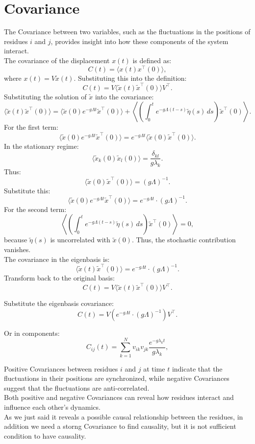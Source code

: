 \documentclass[English, Lau, oneside]{sapthesis}
\begin{document}
\section{Covariance}
\noindent
The Covariance between two variables, such as the fluctuations in the positions of residues \( i \) and \( j \), provides insight into how these components of the system interact.\\
The covariance of the displacement \({x}(t)\) is defined as:\cite{ref13}
\[
{C}(t) = \langle {x}(t) {x}^\top(0) \rangle,
\]
where \({x}(t) = {V} \tilde{{x}}(t)\). Substituting this into the definition:
\[
{C}(t) = {V} \langle \tilde{{x}}(t) \tilde{{x}}^\top(0) \rangle {V}^\top.
\]
Substituting the solution of $\tilde{{x}}$ into the covariance:
\[
\langle \tilde{{x}}(t) \tilde{{x}}^\top(0) \rangle = \langle \tilde{{x}}(0) e^{-{g \Lambda} t} \tilde{{x}}^\top(0) \rangle + \left\langle \left( \int_0^t e^{-g {\Lambda} (t-s)} \tilde{{\eta}}(s) \, ds \right) \tilde{{x}}^\top(0) \right\rangle.
\]
For the first term:
\[
\langle \tilde{{x}}(0) e^{-{g \Lambda} t} \tilde{{x}}^\top(0) \rangle = e^{-{g \Lambda} t} \langle \tilde{{x}}(0) \tilde{{x}}^\top(0) \rangle.
\]
In the stationary regime:
\[
\langle \tilde{x}_k(0) \tilde{x}_l(0) \rangle =  \frac{\delta_{kl}}{g \lambda_k}.
\]
Thus:
\[
\langle \tilde{{x}}(0) \tilde{{x}}^\top(0) \rangle = ({g \Lambda})^{-1}.
\]
Substitute this:
\[
\langle \tilde{{x}}(0) e^{-{g \Lambda} t} \tilde{{x}}^\top(0) \rangle = e^{-{g \Lambda} t} \cdot ({g \Lambda})^{-1} .
\]
For the second term:
\[
\left\langle \left( \int_0^t e^{- g {\Lambda} (t-s)} \tilde{{\eta}}(s) \, ds \right) \tilde{{x}}^\top(0) \right\rangle = 0,
\]
because \(\tilde{{\eta}}(s)\) is uncorrelated with \(\tilde{{x}}(0)\).
Thus, the stochastic contribution vanishes.\\
The covariance in the eigenbasis is:
\[
\langle \tilde{{x}}(t) \tilde{{x}}^\top(0) \rangle = e^{-{g \Lambda} t} \cdot ({g \Lambda})^{-1}.
\]
Transform back to the original basis:
\[
{C}(t) = {V} \langle \tilde{{x}}(t) \tilde{{x}}^\top(0) \rangle {V}^\top.
\]

Substitute the eigenbasis covariance:
\[
{C}(t) = {V} \left( e^{-{g \Lambda} t} \cdot ({g \Lambda})^{-1}  \right) {V}^\top.
\]


Or in components:
\[
C_{ij}(t) = \sum_{k=1}^N v_{ik} v_{jk} \frac{e^{-g \lambda_k t}}{g \lambda_k} ,
\]

Positive Covariances between residues \(i\) and \(j\) at time \(t\) indicate that the fluctuations in their positions are synchronized, while negative Covariances suggest that the fluctuations are anti-correlated.\\
Both positive and negative Covariances can reveal how residues interact and influence each other's dynamics.\\
As we just said it reveals a possible causal relationship between the residues, in addition we need a storng Covariance to find causality, but it is not sufficient condition to have causality.\\
\newpage
\end{document}
